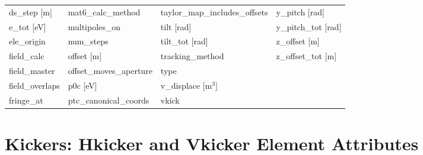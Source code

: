 \begin{tabular}{llll}
ds_step [m]                      & mat6_calc_method                 & taylor_map_includes_offsets      & y_pitch [rad]                    \\
e_tot [eV]                       & multipoles_on                    & tilt [rad]                       & y_pitch_tot [rad]                \\
ele_origin                       & num_steps                        & tilt_tot [rad]                   & z_offset [m]                     \\
field_calc                       & offset [m]                       & tracking_method                  & z_offset_tot [m]                 \\
field_master                     & offset_moves_aperture            & type                             &                                  \\
field_overlaps                   & p0c [eV]                         & v_displace [m$^3$]               &                                  \\
fringe_at                        & ptc_canonical_coords             & vkick                            &                                  \\
 \bottomrule
 \end{tabular}
 \vfill
 
 \section{Kickers: Hkicker and Vkicker Element Attributes}
 \label{s:list.hvkicker}
 

